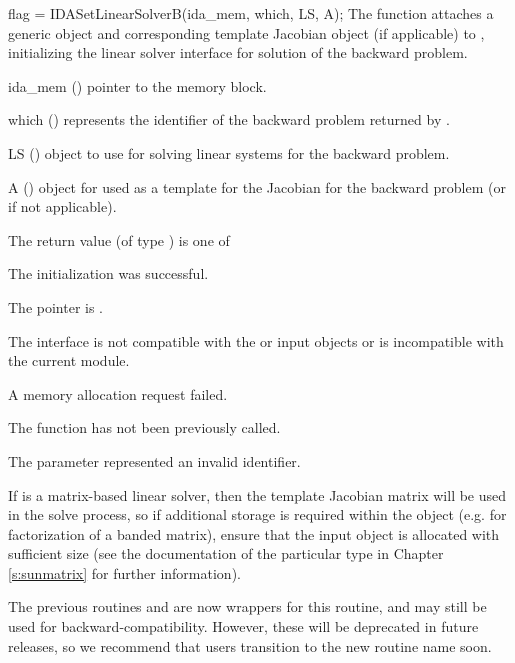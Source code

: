 {
  flag = IDASetLinearSolverB(ida\_mem, which, LS, A);
}
{
  The function  attaches a generic
  {\sunlinsol} object  and corresponding template
  Jacobian {\sunmatrix} object  (if applicable) to {\idas},
  initializing the {\idals} linear solver interface for solution of
  the backward problem.
}
{
  \begin{args}
  \item[ida\_mem] ()
    pointer to the {\idas} memory block.
  \item[which] ()
    represents the identifier of the backward problem returned by .
  \item[LS] ()
    {\sunlinsol} object to use for solving linear systems for the backward problem.
  \item[A] ()
    {\sunmatrix} object for used as a template for the Jacobian for the backward
    problem (or  if not applicable).
  \end{args}
}
{
  The return value  (of type ) is one of
  \begin{args}
  \item[\Id{IDALS\_SUCCESS}]
    The {\idals} initialization was successful.
  \item[\Id{IDALS\_MEM\_NULL}]
    The  pointer is .
  \item[\Id{IDALS\_ILL\_INPUT}]
    The {\idals} interface is not compatible with the  or
     input objects or is incompatible with the current
    {\nvector} module.
  \item[\Id{IDALS\_MEM\_FAIL}]
    A memory allocation request failed.
  \item[\Id{IDALS\_NO\_ADJ}]
    The function  has not been previously called.
  \item[\Id{IDALS\_ILL\_INPUT}]
    The parameter  represented an invalid identifier.
  \end{args}
}
{
  If  is a matrix-based linear solver, then the template
  Jacobian matrix  will be used in the solve process, so if
  additional storage is required within the {\sunmatrix} object
  (e.g. for factorization of a banded matrix), ensure that the input
  object is allocated with sufficient size (see the documentation of
  the particular {\sunmatrix} type in Chapter \ref{s:sunmatrix} for
  further information).

  The previous routines  and
   are now wrappers for this routine, and may
  still be used for backward-compatibility.  However, these will be
  deprecated in future releases, so we recommend that users transition
  to the new routine name soon.
}

